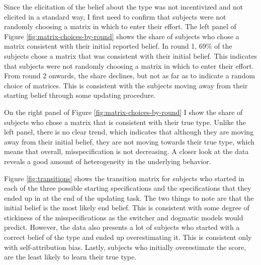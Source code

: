 \documentclass[
  12pt,
]{article}
\begin{document}
Since the elicitation of the belief about the type was not incentivized
and not elicited in a standard way, I first need to confirm that
subjects were not randomly choosing a matrix in which to enter their
effort. The left panel of Figure \ref{fig:matrix-choices-by-round} shows
the share of subjects who chose a matrix consistent with their initial
reported belief. In round 1, 69\% of the subjects chose a matrix that
was consistent with their initial belief. This indicates that subjects
were not randomly choosing a matrix in which to enter their effort. From
round 2 onwards, the share declines, but not as far as to indicate a
random choice of matrices. This is consistent with the subjects moving
away from their starting belief through some updating procedure.

On the right panel of Figure \ref{fig:matrix-choices-by-round} I show
the share of subjects who chose a matrix that is consistent with their
true type. Unlike the left panel, there is no clear trend, which
indicates that although they are moving away from their initial belief,
they are not moving towards their true type, which means that overall,
misspecification is not decreasing. A closer look at the data reveals a
good amount of heterogeneity in the underlying behavior.

Figure \ref{fig:transitions} shows the transition matrix for subjects
who started in each of the three possible starting specifications and
the specifications that they ended up in at the end of the updating
task. The two things to note are that the initial belief is the most
likely end belief. This is consistent with some degree of stickiness of
the misspecifications as the switcher and dogmatic models would predict.
However, the data also presents a lot of subjects who started with a
correct belief of the type and ended up overestimating it. This is
consistent only with self-attribution bias. Lastly, subjects who
initially overestimate the score, are the least likely to learn their
true type.
\end{document}

